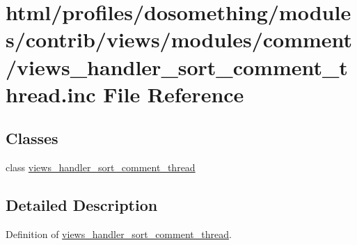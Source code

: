 \hypertarget{views__handler__sort__comment__thread_8inc}{
\section{html/profiles/dosomething/modules/contrib/views/modules/comment/views\_\-handler\_\-sort\_\-comment\_\-thread.inc File Reference}
\label{views__handler__sort__comment__thread_8inc}
}
\subsection*{Classes}
\begin{DoxyCompactItemize}
\item 
class \hyperlink{classviews__handler__sort__comment__thread}{views\_\-handler\_\-sort\_\-comment\_\-thread}
\end{DoxyCompactItemize}


\subsection{Detailed Description}
Definition of \hyperlink{classviews__handler__sort__comment__thread}{views\_\-handler\_\-sort\_\-comment\_\-thread}. 